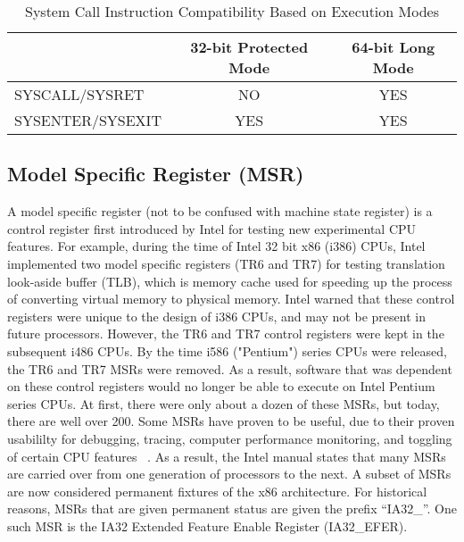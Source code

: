 \documentclass{report}
\begin{document}
\begin{spacing}{1.5}
\begin{table}[ht]
\centering
\caption{System Call Instruction Compatibility Based on Execution Modes}
\begin{tabular}[t]{lcc}
\hline
&32-bit Protected Mode&64-bit Long Mode\\
\hline
SYSCALL/SYSRET &NO&YES\\
SYSENTER/SYSEXIT&YES&YES\\
\hline
\end{tabular}
\end{table}%



\subsection{Model Specific Register (MSR)}

{\large
A model specific register (not to be confused with machine state register) is a control register first introduced by Intel for testing new experimental CPU features. For example, during the time of Intel 32 bit x86 (i386) CPUs, Intel implemented two model specific registers (TR6 and TR7) for testing translation look-aside buffer (TLB), which is memory cache used for speeding up the process of converting virtual memory to physical memory. Intel warned that these control registers were unique to the design of i386 CPUs, and may not be present in future processors. However, the TR6 and TR7 control registers were kept in the subsequent i486 CPUs. By the time i586 ("Pentium") series CPUs were released, the TR6 and TR7 MSRs were removed. As a result, software that was dependent on these control registers would no longer be able to execute on Intel Pentium series CPUs. At first, there were only about a dozen of these MSRs, but today, there are well over 200. Some MSRs have proven to be useful, due to their proven usabililty for debugging, tracing, computer performance monitoring, and toggling of certain CPU features ~\cite{intelMSRManual}. As a result, the Intel manual states that many MSRs are carried over from one generation of processors to the next. A subset of MSRs are now considered permanent fixtures of the x86 architecture. For historical reasons, MSRs that are given permanent status are given the prefix “IA32\_”. One such MSR is the IA32 Extended Feature Enable Register (IA32\_EFER).
\newline
}


\end{spacing}
\end{document}
